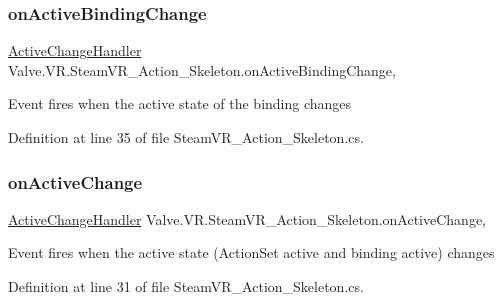 \subsubsection{\texorpdfstring{onActiveBindingChange}{onActiveBindingChange}}
{\footnotesize\ttfamily \mbox{\hyperlink{class_valve_1_1_v_r_1_1_steam_v_r___action___skeleton_ae329ff2582f41c7ec52ecdf3b34b345a}{Active\+Change\+Handler}} Valve.\+V\+R.\+Steam\+V\+R\+\_\+\+Action\+\_\+\+Skeleton.\+on\+Active\+Binding\+Change\hspace{0.3cm}{\ttfamily [add]}, {\ttfamily [remove]}}



Event fires when the active state of the binding changes 



Definition at line 35 of file Steam\+V\+R\+\_\+\+Action\+\_\+\+Skeleton.\+cs.

\mbox{\label{class_valve_1_1_v_r_1_1_steam_v_r___action___skeleton_ad0281a649602158d0c570073542301c6}} 
\subsubsection{\texorpdfstring{onActiveChange}{onActiveChange}}
{\footnotesize\ttfamily \mbox{\hyperlink{class_valve_1_1_v_r_1_1_steam_v_r___action___skeleton_ae329ff2582f41c7ec52ecdf3b34b345a}{Active\+Change\+Handler}} Valve.\+V\+R.\+Steam\+V\+R\+\_\+\+Action\+\_\+\+Skeleton.\+on\+Active\+Change\hspace{0.3cm}{\ttfamily [add]}, {\ttfamily [remove]}}



Event fires when the active state (Action\+Set active and binding active) changes 



Definition at line 31 of file Steam\+V\+R\+\_\+\+Action\+\_\+\+Skeleton.\+cs.

\mbox{\label{class_valve_1_1_v_r_1_1_steam_v_r___action___skeleton_ac8453162e7dbb072e4b3677d82239947}} 

